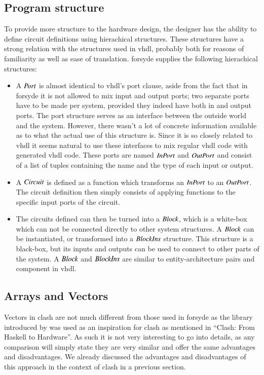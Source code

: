 \subsection{Program structure}
To provide more structure to the hardware design, the designer has the ability to define circuit definitions using hierachical structures. 
These structures have a strong relation with the structures used in \gls{vhdl}, probably both for reasons of familiarity as well as ease of translation. 
\gls{forsyde} supplies the following hierachical structures:
\begin{itemize}
\item 
A \ensuremath{\Conid{Port}} is almost identical to \gls{vhdl}'s port clause, aside from the fact that in \gls{forsyde} it is not allowed to mix input and output ports; two separate ports have to be made per system, provided they indeed have both in and output ports. 
The port structure serves as an interface between the outside world and the system. 
However, there wasn't a lot of concrete information available as to what the actual use of this structure is. 
Since it is so closely related to \gls{vhdl} it seems natural to use these interfaces to mix regular \gls{vhdl} code with generated \gls{vhdl} code. 
These ports are named \ensuremath{\Conid{InPort}} and \ensuremath{\Conid{OutPort}} and consist of a list of tuples containing the name and the type of each input or output.
\item A \ensuremath{\Conid{Circuit}} is defined as a function which transforms an \ensuremath{\Conid{InPort}} to an \ensuremath{\Conid{OutPort}}. The circuit definition then simply consists of applying functions to the specific input ports of the circuit.
\item The circuits defined can then be turned into a \ensuremath{\Conid{Block}}, which is a white-box which can not be connected directly to other system structures. A \ensuremath{\Conid{Block}} can be instantiated, or transformed into a \ensuremath{\Conid{BlockIns}} structure.
This structure is a black-box, but its inputs and outputs can be used to connect to other parts of the system. 
A \ensuremath{\Conid{Block}} and \ensuremath{\Conid{BlockIns}} are similar to entity-architecture pairs and component in \gls{vhdl}. 
\end{itemize}

\subsection{Arrays and Vectors}
Vectors in \gls{clash} are not much different from those used in \gls{forsyde} as the library introduced\cite{acosta2008forsyde} by \citeauthor{acosta2008forsyde} was used as an inspiration for \gls{clash} as mentioned in ``Clash: From Haskell to Hardware''\cite{clashchris}.
As such it is not very interesting to go into details, as any comparison will simply state they are very similar and offer the same advantages and disadvantages. 
We already discussed the advantages and disadvantages of this approach in the context of \gls{clash} in a previous section.

